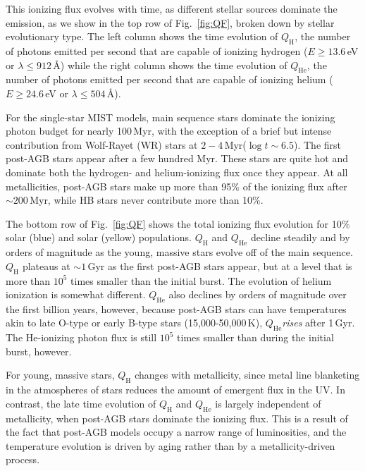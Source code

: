 \documentclass[preprint2]{aastex62}
\newcommand{\ang}{\ensuremath{\mbox{\AA}}\xspace}
\newcommand{\QH}{\ensuremath{Q_{\mathrm{H}}}\xspace}
\newcommand{\QHe}{\ensuremath{Q_{\mathrm{He}}}\xspace}
\newcommand{\Myr}{$\,$Myr\xspace}
\newcommand{\Gyr}{$\,$Gyr\xspace}
\begin{document}
This ionizing flux evolves with time, as different stellar sources dominate the emission, as we show in the top row of Fig.~\ref{fig:QF}, broken down by stellar evolutionary type. The left column shows the time evolution of \QH, the number of photons emitted per second that are capable of ionizing hydrogen ($E\geq13.6\,$eV or $\lambda \leq 912\,$\ang) while the right column shows the time evolution of \QHe, the number of photons emitted per second that are capable of ionizing helium ($E\geq24.6\,$eV or $\lambda \leq 504\,$\ang).

For the single-star MIST models, main sequence stars dominate the ionizing photon budget for nearly 100\Myr, with the exception of a brief but intense contribution from Wolf-Rayet (WR) stars at $2-4$\Myr ($\log t\sim6.5$). The first post-AGB stars appear after a few hundred Myr. These stars are quite hot and dominate both the hydrogen- and helium-ionizing flux once they appear. At all metallicities, post-AGB stars make up more than 95\% of the ionizing flux after $\sim200$\Myr, while HB stars never contribute more than 10\%.

The bottom row of Fig.~\ref{fig:QF} shows the total ionizing flux evolution for 10\% solar (blue) and solar (yellow) populations. \QH and \QHe decline steadily and by orders of magnitude as the young, massive stars evolve off of the main sequence. \QH plateaus at ${\sim}1$\Gyr as the first post-AGB stars appear, but at a level that is more than $10^5$ times smaller than the initial burst. The evolution of helium ionization is somewhat different. \QHe also declines by orders of magnitude over the first billion years, however, because post-AGB stars can have temperatures akin to late O-type or early B-type stars (15,000-50,000\,K), \QHe \emph{rises} after 1\Gyr. The He-ionizing photon flux is still $10^5$ times smaller than during the initial burst, however.

For young, massive stars, \QH changes with metallicity, since metal line blanketing in the atmospheres of stars reduces the amount of emergent flux in the UV. In contrast, the late time evolution of \QH and \QHe is largely independent of metallicity, when post-AGB stars dominate the ionizing flux. This is a result of the fact that post-AGB models occupy a narrow range of luminosities, and the temperature evolution is driven by aging rather than by a metallicity-driven process.
\end{document}

